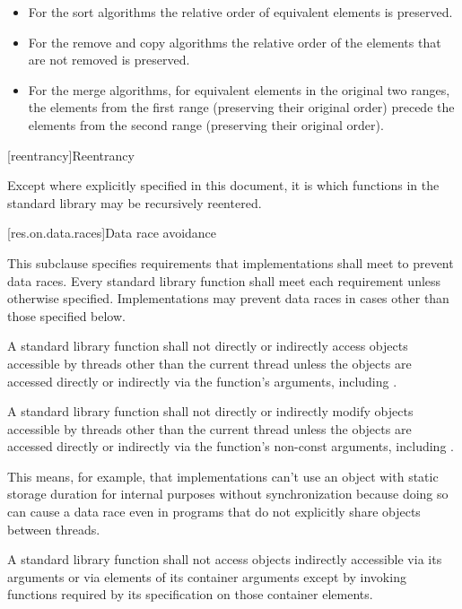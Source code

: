 \begin{itemize}
\item For the sort algorithms the relative order of equivalent
elements is preserved.

\item For the remove and copy algorithms the relative order of
the elements that are not removed is preserved.

\item For the merge algorithms, for equivalent elements in
the original two ranges, the elements from the first range (preserving their
original order) precede the elements from the second range (preserving their
original order).
\end{itemize}

[reentrancy]{Reentrancy}

\pnum
Except where explicitly specified in this document, it is  which functions in the \Cpp{} standard
library may be recursively reentered.

[res.on.data.races]{Data race avoidance}

\pnum
This subclause specifies requirements that implementations shall meet to prevent data
races.
Every standard library function shall meet each requirement unless otherwise specified.
Implementations may prevent data races in cases other than those specified below.

\pnum
A \Cpp{} standard library function shall not directly or indirectly access
objects accessible by threads other than the current thread
unless the objects are accessed directly or indirectly via the function's arguments,
including .

\pnum
A \Cpp{} standard library function shall not directly or indirectly modify
objects accessible by threads other than the current thread
unless the objects are accessed directly or indirectly via the function's non-const
arguments, including .

\pnum
\begin{note}
This means, for example, that implementations can't use an object with static storage duration for
internal purposes without synchronization because doing so can cause a data race even in
programs that do not explicitly share objects between threads.
\end{note}

\pnum
A \Cpp{} standard library function shall not access objects indirectly accessible via its
arguments or via elements of its container arguments except by invoking functions
required by its specification on those container elements.

